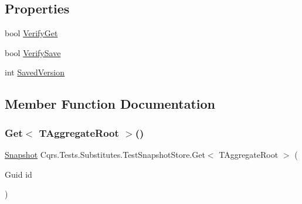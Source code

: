\subsection*{Properties}
\begin{DoxyCompactItemize}
\item 
bool \hyperlink{classCqrs_1_1Tests_1_1Substitutes_1_1TestSnapshotStore_a30735e964f5ebe4502f4e3b6740b94e5_a30735e964f5ebe4502f4e3b6740b94e5}{Verify\+Get}
\item 
bool \hyperlink{classCqrs_1_1Tests_1_1Substitutes_1_1TestSnapshotStore_afcd205610fd1bcb6c02884200f1c95f4_afcd205610fd1bcb6c02884200f1c95f4}{Verify\+Save}
\item 
int \hyperlink{classCqrs_1_1Tests_1_1Substitutes_1_1TestSnapshotStore_a6fd401fb82c4f82d32ef38c8fd964fb5_a6fd401fb82c4f82d32ef38c8fd964fb5}{Saved\+Version}
\end{DoxyCompactItemize}


\subsection{Member Function Documentation}
\mbox{\label{classCqrs_1_1Tests_1_1Substitutes_1_1TestSnapshotStore_adc420bde9bd2e180a89a3a914e72691a_adc420bde9bd2e180a89a3a914e72691a}} 
\subsubsection{\texorpdfstring{Get$<$ T\+Aggregate\+Root $>$()}{Get< TAggregateRoot >()}}
{\footnotesize\ttfamily \hyperlink{classCqrs_1_1Snapshots_1_1Snapshot}{Snapshot} Cqrs.\+Tests.\+Substitutes.\+Test\+Snapshot\+Store.\+Get$<$ T\+Aggregate\+Root $>$ (\begin{DoxyParamCaption}\item[{Guid}]{id }\end{DoxyParamCaption})}



